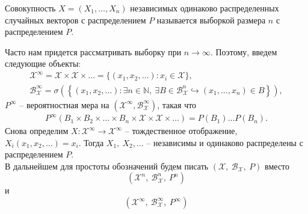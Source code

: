 \begin{definition}
	Совокупность $\displaystyle X=( X_{1} ,\dotsc ,X_{n})$ независимых одинаково распределенных случайных векторов с распределением $\displaystyle P$ называется выборкой размера $\displaystyle n$ с распределением $\displaystyle P$.
\end{definition}
Часто нам придется рассматривать выборку при $\displaystyle n\rightarrow \infty $. Поэтому, введем следующие объекты: 
\begin{gather*}
    \mathcal{X}^{\infty } =\mathcal{X} \times \mathcal{X} \times \dotsc =\{( x_{1} ,x_{2} ,\dotsc ) :x_{i} \in \mathcal{X}\},\\ \displaystyle \mathcal{B}_{\mathcal{X}}^{\infty } =\sigma \left(\left\{( x_{1} ,x_{2} ,\dotsc ) :\exists n\in \mathbb{N} ,\ \exists B\in \mathcal{B}_{\mathcal{X}}^{n} \hookrightarrow ( x_{1} ,\dotsc ,x_{n}) \in B\right\}\right),
\end{gather*}
$\displaystyle P^{\infty }$ -- вероятностная мера на $\displaystyle \left(\mathcal{X}^{\infty } ,\mathcal{B}_{\mathcal{X}}^{\infty }\right)$, такая что 
\begin{gather*}
    P^{\infty }( B_{1} \times B_{2} \times \dotsc \times B_{n} \times \mathcal{X} \times \mathcal{X} \times \dotsc ) =P( B_{1}) \dotsc P( B_{n}).
\end{gather*}
Снова определим $\displaystyle X:\mathcal{X}^{\infty }\rightarrow \mathcal{X}^{\infty }$ -- тождественное отображение, $\displaystyle X_{i}( x_{1} ,x_{2} ,\dotsc ) =x_{i}$. Тогда $\displaystyle X_{1},\ X_{2} ,\dotsc $ -- независимы и одинаково распределены с распределением $\displaystyle P$.
\\
В дальнейшем для простоты обозначений будем писать $\displaystyle (\mathcal{X},\ \mathcal{B}_{\mathcal{X}},\ P)$ вместо $$\displaystyle \left(\mathcal{X}^{n},\ \mathcal{B}_{\mathcal{X}}^{n},\ P^{n}\right)$$ и \ $$\displaystyle \left(\mathcal{X}^{\infty },\ \mathcal{B}_{\mathcal{X}}^{\infty },\ P^{\infty }\right)$$

